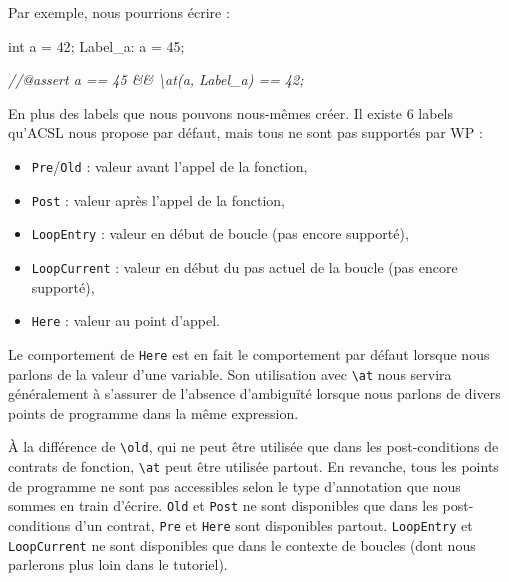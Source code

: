 \documentclass[12pt,francais,]{scrbook}
\newenvironment{Shaded}{}{}
\newcommand{\DataTypeTok}[1]{\textcolor[rgb]{0.56,0.13,0.00}{{#1}}}
\newcommand{\DecValTok}[1]{\textcolor[rgb]{0.25,0.63,0.44}{{#1}}}
\newcommand{\CommentTok}[1]{\textcolor[rgb]{0.38,0.63,0.69}{\textit{{#1}}}}
\newcommand{\NormalTok}[1]{{#1}}
\providecommand{\tightlist}{%
  \setlength{\itemsep}{0pt}\setlength{\parskip}{0pt}}
\newenvironment{zdsblock}[1]{%
  \tcolorbox[beamer,%
    noparskip,breakable,
    colback=LightBlue,colframe=DarkBlue,%
    colbacklower=DarkBlue,%
    title=#1]
}{\endtcolorbox}
\begin{document}
Par exemple, nous pourrions écrire :

\begin{footnotesize}\begin{Shaded}
\begin{Highlighting}[]
  \DataTypeTok{int} \NormalTok{a = }\DecValTok{42}\NormalTok{;}
 \NormalTok{Label_a:}
  \NormalTok{a = }\DecValTok{45}\NormalTok{;}

  \CommentTok{//@assert a == 45 && \textbackslash{}at(a, Label_a) == 42;}
\end{Highlighting}
\end{Shaded}\end{footnotesize}

En plus des labels que nous pouvons nous-mêmes créer. Il existe 6 labels
qu'ACSL nous propose par défaut, mais tous ne sont pas supportés par WP
:

\begin{itemize}
\tightlist
\item
  \texttt{Pre}/\texttt{Old} : valeur avant l'appel de la fonction,
\item
  \texttt{Post} : valeur après l'appel de la fonction,
\item
  \texttt{LoopEntry} : valeur en début de boucle (pas encore supporté),
\item
  \texttt{LoopCurrent} : valeur en début du pas actuel de la boucle (pas
  encore supporté),
\item
  \texttt{Here} : valeur au point d'appel.
\end{itemize}

\begin{zdsblock}{Information}
  Le comportement de \texttt{Here} est
  en fait le comportement par défaut lorsque nous parlons de la
  valeur d'une variable. Son utilisation avec \texttt{\textbackslash{}at}
  nous servira généralement à s'assurer de l'absence
  d'ambiguïté lorsque nous parlons de divers points de
  programme dans la même expression.
\end{zdsblock}

À la différence de \texttt{\textbackslash{}old}, qui ne peut être
utilisée que dans les post-conditions de contrats de fonction,
\texttt{\textbackslash{}at} peut être utilisée partout. En revanche,
tous les points de programme ne sont pas accessibles selon le type
d'annotation que nous sommes en train d'écrire. \texttt{Old} et
\texttt{Post} ne sont disponibles que dans les post-conditions d'un
contrat, \texttt{Pre} et \texttt{Here} sont disponibles partout.
\texttt{LoopEntry} et \texttt{LoopCurrent} ne sont disponibles que dans
le contexte de boucles (dont nous parlerons plus loin dans le tutoriel).
\end{document}
